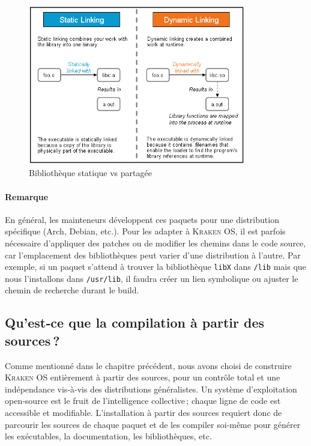 \begin{figure}[!htbp]
  \centering
  \includegraphics[width=0.85\textwidth]{images_pfe/sharedlibraryvsstatic.png}
  \caption{Bibliothèque statique vs partagée}
  \label{fig:staticsharedl}
\end{figure}

\paragraph{Remarque}  
En général, les mainteneurs développent ces paquets pour une distribution spécifique (Arch, Debian, etc.). Pour les adapter à \textsc{Kraken OS}, il est parfois nécessaire d’appliquer des patches ou de modifier les chemins dans le code source, car l’emplacement des bibliothèques peut varier d’une distribution à l’autre.  
Par exemple, si un paquet s’attend à trouver la bibliothèque \texttt{libX} dans \texttt{/lib} mais que nous l’installons dans \texttt{/usr/lib}, il faudra créer un lien symbolique ou ajuster le chemin de recherche durant le build.





\subsection{Qu’est‑ce que la compilation à partir des sources ?}
\label{subsec:compilation-sources}

Comme mentionné dans le chapitre précédent, nous avons choisi de construire \textsc{Kraken OS} entièrement à partir des sources, pour un contrôle total et une indépendance vis‑à‑vis des distributions généralistes.  
Un système d’exploitation open‑source est le fruit de l’intelligence collective ; chaque ligne de code est accessible et modifiable. L’installation à partir des sources requiert donc de parcourir les sources de chaque paquet et de les compiler soi‑même pour générer les exécutables, la documentation, les bibliothèques, etc.

